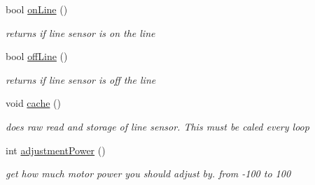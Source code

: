 \begin{DoxyCompactItemize}
bool \hyperlink{classLineSensor_ad9d3c5a694f1ff946d1137df1694b026}{on\-Line} ()
\begin{DoxyCompactList}\small\item\em returns if line sensor is on the line \end{DoxyCompactList}\item 
bool \hyperlink{classLineSensor_a0dea8f6d7e7e27d050feecb3e549a149}{off\-Line} ()
\begin{DoxyCompactList}\small\item\em returns if line sensor is off the line \end{DoxyCompactList}\item 
void \hyperlink{classLineSensor_afc809d2aa49426d949f76f68b0154050}{cache} ()
\begin{DoxyCompactList}\small\item\em does raw read and storage of line sensor. This must be caled every loop \end{DoxyCompactList}\item 
int \hyperlink{classLineSensor_a74c3c2d7a454aeacae90501670d01bdc}{adjustment\-Power} ()
\begin{DoxyCompactList}\small\item\em get how much motor power you should adjust by. from -\/100 to 100 \end{DoxyCompactList}\end{DoxyCompactItemize}
